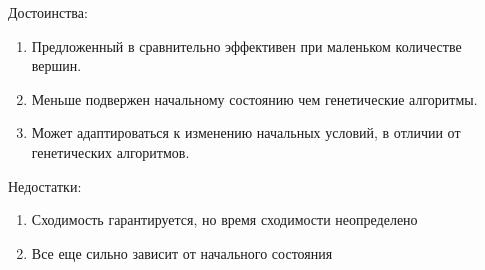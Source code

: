 \documentclass{article}
\begin{document}
\par Достоинства:
\begin{enumerate}
  \item Предложенный в \cite{Kostenko_Plakunov_2017} сравнительно эффективен при маленьком количестве вершин.
  \item Меньше подвержен начальному состоянию чем генетические алгоритмы.
  \item Может адаптироваться к изменению начальных условий, в отличии от генетических алгоритмов.
\end{enumerate}
\par Недостатки:
\begin{enumerate}
  \item Сходимость гарантируется, но время сходимости неопределено
  \item Все еще сильно зависит от начального состояния
\end{enumerate}
\newpage

\printbibliography
\end{document}
